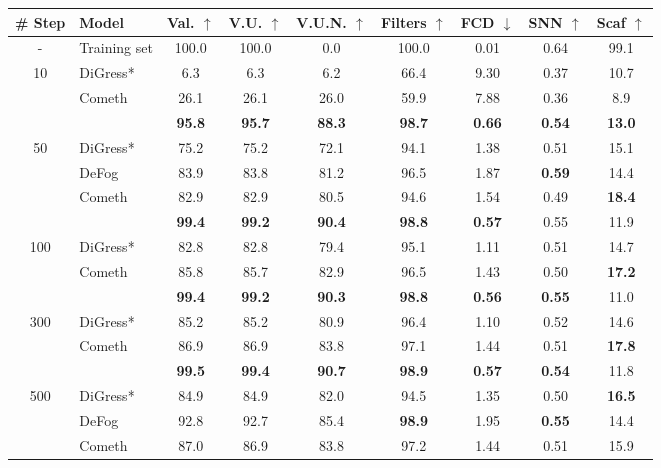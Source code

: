 \begin{table}[h!]
\centering
{
\begin{tabular}{c|l|ccccccc}
\toprule
\# Step & Model & Val. $\uparrow$ & V.U. $\uparrow$ & V.U.N. $\uparrow$ & Filters $\uparrow$ & FCD $\downarrow$ & SNN $\uparrow$ & Scaf $\uparrow$ \\
\midrule
- & Training set & 100.0 & 100.0 & 0.0 & 100.0 & 0.01 & 0.64 & 99.1 \\
\midrule
\multirow{3}{*}{10} 
    & DiGress* & 6.3  & 6.3  & 6.2  & 66.4 & 9.30 & 0.37 & 10.7 \\
    & Cometh & 26.1 & 26.1 & 26.0 & 59.9 & 7.88 & 0.36 & 8.9  \\
    & \methodname{} & \textbf{95.8} & \textbf{95.7} & \textbf{88.3} & \textbf{98.7} & \textbf{0.66} & \textbf{0.54} & \textbf{13.0} \\
\midrule
\multirow{4}{*}{50}
    & DiGress*  & 75.2 & 75.2 & 72.1 & 94.1 & 1.38 & 0.51 & 15.1 \\
    & DeFog & 83.9 & 83.8 & 81.2 & 96.5 & 1.87 & \textbf{0.59} & 14.4 \\
    & Cometh & 82.9 & 82.9 & 80.5 & 94.6 & 1.54 & 0.49 & \textbf{18.4} \\
    & \methodname{} & \textbf{99.4} & \textbf{99.2} & \textbf{90.4} & \textbf{98.8} & \textbf{0.57} & 0.55 & 11.9 \\
\midrule
\multirow{3}{*}{100} 
    & DiGress* & 82.8 & 82.8 & 79.4 & 95.1 & 1.11 & 0.51 & 14.7 \\
    & Cometh & 85.8 & 85.7 & 82.9 & 96.5 & 1.43 & 0.50 & \textbf{17.2} \\
    & \methodname{} & \textbf{99.4} & \textbf{99.2} & \textbf{90.3} & \textbf{98.8} & \textbf{0.56} & \textbf{0.55} & 11.0 \\
\midrule
\multirow{3}{*}{300} 
    & DiGress* & 85.2 & 85.2 & 80.9 & 96.4 & 1.10 & 0.52 & 14.6 \\
    & Cometh & 86.9 & 86.9 & 83.8 & 97.1 & 1.44 & 0.51 & \textbf{17.8} \\
    & \methodname{} & \textbf{99.5} & \textbf{99.4} & \textbf{90.7} & \textbf{98.9} & \textbf{0.57} & \textbf{0.54} & 11.8 \\
\midrule
\multirow{4}{*}{500} 
    & DiGress* & 84.9 & 84.9 & 82.0 & 94.5 & 1.35 & 0.50 & \textbf{16.5} \\
    & DeFog & 92.8 & 92.7 & 85.4 & \textbf{98.9} & 1.95 & \textbf{0.55} & 14.4 \\
    & Cometh & 87.0 & 86.9 & 83.8 & 97.2 & 1.44 & 0.51 & 15.9 \\

\end{tabular}}
\end{table}
